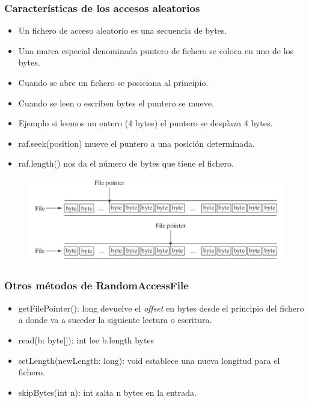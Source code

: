 \documentclass{beamer}
\begin{document}
\begin{frame}
\frametitle{Características de los accesos aleatorios}
\begin{itemize}[<+->]
\item Un fichero de acceso aleatorio es una secuencia de bytes.
\item Una marca especial denominada \alert{puntero de fichero} se coloca en uno de los bytes.
\item Cuando se abre un fichero se posiciona al principio.
\item Cuando se leen o escriben bytes el puntero se mueve.
\item Ejemplo si leemos un entero (4 bytes) el puntero se desplaza 4 bytes.
\item \alert{raf.seek(position)} mueve el puntero a una posición determinada.
\item \alert{raf.length()} nos da el número de bytes que tiene el fichero.
\end{itemize}
\begin{figure}
\includegraphics[scale=0.4]{imagenes/puntero.png}
\end{figure}
\end{frame}

\begin{frame}
\frametitle{Otros métodos de RandomAccessFile}
\begin{itemize}
\item \alert{getFilePointer(): long} devuelve el \emph{offset} en bytes desde el principio del fichero a donde va a suceder la siguiente lectura o escritura.
\item \alert{read(b: byte[]): int} lee b.length bytes
\item \alert{setLength(newLength: long): void} establece una nueva longitud para el fichero.
\item \alert{skipBytes(int n): int} salta n bytes en la entrada.
\end{itemize}
\end{frame}
\end{document}

